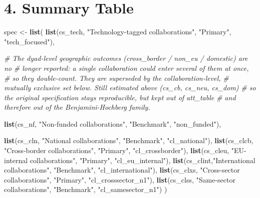 \documentclass[
]{article}
\newenvironment{Shaded}{\begin{snugshade}}{\end{snugshade}}
\newcommand{\CommentTok}[1]{\textcolor[rgb]{0.56,0.35,0.01}{\textit{#1}}}
\newcommand{\FunctionTok}[1]{\textcolor[rgb]{0.13,0.29,0.53}{\textbf{#1}}}
\newcommand{\NormalTok}[1]{#1}
\newcommand{\OtherTok}[1]{\textcolor[rgb]{0.56,0.35,0.01}{#1}}
\newcommand{\StringTok}[1]{\textcolor[rgb]{0.31,0.60,0.02}{#1}}
\begin{document}
\section{4. Summary Table}\label{summary-table}

\begin{Shaded}
\begin{Highlighting}[]
\NormalTok{spec }\OtherTok{\textless{}{-}} \FunctionTok{list}\NormalTok{(}
  \FunctionTok{list}\NormalTok{(cs\_tech, }\StringTok{"Technology{-}tagged collaborations"}\NormalTok{, }\StringTok{"Primary"}\NormalTok{, }\StringTok{"tech\_focused"}\NormalTok{),}

  \CommentTok{\# The dyad{-}level geographic outcomes (cross\_border / non\_eu / domestic) are no}
  \CommentTok{\# longer reported: a single collaboration could enter several of them at once,}
  \CommentTok{\# so they double{-}count. They are superseded by the collaboration{-}level,}
  \CommentTok{\# mutually exclusive set below. Still estimated above (cs\_cb, cs\_neu, cs\_dom)}
  \CommentTok{\# so the original specification stays reproducible, but kept out of att\_table}
  \CommentTok{\# and therefore out of the Benjamini{-}Hochberg family.}

  \FunctionTok{list}\NormalTok{(cs\_nf,   }\StringTok{"Non{-}funded collaborations"}\NormalTok{,         }\StringTok{"Benchmark"}\NormalTok{,  }\StringTok{"non\_funded"}\NormalTok{),}

  \FunctionTok{list}\NormalTok{(cs\_cln,  }\StringTok{"National collaborations"}\NormalTok{,          }\StringTok{"Benchmark"}\NormalTok{, }\StringTok{"cl\_national"}\NormalTok{),}
  \FunctionTok{list}\NormalTok{(cs\_clcb, }\StringTok{"Cross{-}border collaborations"}\NormalTok{,      }\StringTok{"Primary"}\NormalTok{,   }\StringTok{"cl\_crossborder"}\NormalTok{),}
  \FunctionTok{list}\NormalTok{(cs\_cleu, }\StringTok{"EU{-}internal collaborations"}\NormalTok{,       }\StringTok{"Primary"}\NormalTok{,   }\StringTok{"cl\_eu\_internal"}\NormalTok{),}
  \FunctionTok{list}\NormalTok{(cs\_clint,}\StringTok{"International collaborations"}\NormalTok{,     }\StringTok{"Benchmark"}\NormalTok{, }\StringTok{"cl\_international"}\NormalTok{),}
  \FunctionTok{list}\NormalTok{(cs\_clxs, }\StringTok{"Cross{-}sector collaborations"}\NormalTok{,      }\StringTok{"Primary"}\NormalTok{,   }\StringTok{"cl\_crosssector\_n1"}\NormalTok{),}
  \FunctionTok{list}\NormalTok{(cs\_clss, }\StringTok{"Same{-}sector collaborations"}\NormalTok{,       }\StringTok{"Benchmark"}\NormalTok{, }\StringTok{"cl\_samesector\_n1"}\NormalTok{)}
\NormalTok{)}


\end{Highlighting}
\end{Shaded}
\end{document}
